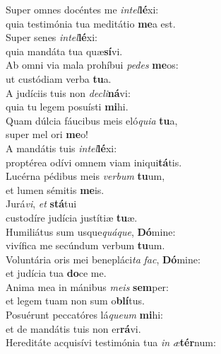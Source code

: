 \oddverse Super omnes docéntes me \textit{in}\textit{tel}\textbf{lé}xi:~\*\\
\oddverse quia testimónia tua meditátio \textbf{me}a est.\\
\evenverse Super senes \textit{in}\textit{tel}\textbf{lé}xi:~\*\\
\evenverse quia mandáta tua quæ\textbf{sí}vi.\\
\oddverse Ab omni via mala prohíbui \textit{pe}\textit{des} \textbf{me}os:~\*\\
\oddverse ut custódiam verba \textbf{tu}a.\\
\evenverse A judíciis tuis non \textit{de}\textit{cli}\textbf{ná}vi:~\*\\
\evenverse quia tu legem posuísti \textbf{mi}hi.\\
\oddverse Quam dúlcia fáucibus meis eló\textit{qui}\textit{a} \textbf{tu}a,~\*\\
\oddverse super mel ori \textbf{me}o!\\
\evenverse A mandátis tuis \textit{in}\textit{tel}\textbf{lé}xi:~\*\\
\evenverse proptérea odívi omnem viam iniqui\textbf{tá}tis.\\
\oddverse Lucérna pédibus meis \textit{ver}\textit{bum} \textbf{tu}um,~\*\\
\oddverse et lumen sémitis \textbf{me}is.\\
\evenverse Jurá\textit{vi}, \textit{et} \textbf{stá}tui~\*\\
\evenverse custodíre judícia justítiæ \textbf{tu}æ.\\
\oddverse Humiliátus sum usque\textit{quá}\textit{que}, \textbf{Dó}mine:~\*\\
\oddverse vivífica me secúndum verbum \textbf{tu}um.\\
\evenverse Voluntária oris mei benepláci\textit{ta} \textit{fac}, \textbf{Dó}mine:~\*\\
\evenverse et judícia tua \textbf{do}ce me.\\
\oddverse Anima mea in mánibus \textit{me}\textit{is} \textbf{sem}per:~\*\\
\oddverse et legem tuam non sum o\textbf{blí}tus.\\
\evenverse Posuérunt peccatóres lá\textit{que}\textit{um} \textbf{mi}hi:~\*\\
\evenverse et de mandátis tuis non er\textbf{rá}vi.\\
\oddverse Hereditáte acquisívi testimónia tua \textit{in} \textit{æ}\textbf{tér}num:~\*\\
